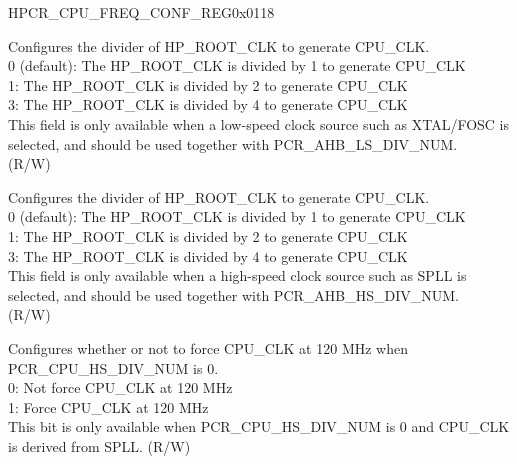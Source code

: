 \begin{register}{H}{PCR\_CPU\_FREQ\_CONF\_REG}{0x0118}\label{regdesc:PCRCPUFREQCONFREG}
%
%
%
%
\regnewline%
\begin{regdesc}\begin{reglist}
\label{fielddesc:PCRCPULSDIVNUM}\item [PCR\_CPU\_LS\_DIV\_NUM] Configures the divider of HP\_ROOT\_CLK to generate CPU\_CLK.\\
0 (default): The HP\_ROOT\_CLK is divided by 1 to generate CPU\_CLK\\
1: The HP\_ROOT\_CLK is divided by 2 to generate CPU\_CLK\\
3: The HP\_ROOT\_CLK is divided by 4 to generate CPU\_CLK\\
This field is only available when a low-speed clock source such as XTAL/FOSC is selected, and should be used together with PCR\_AHB\_LS\_DIV\_NUM.\\ (R/W)
\label{fielddesc:PCRCPUHSDIVNUM}\item [PCR\_CPU\_HS\_DIV\_NUM] Configures the divider of HP\_ROOT\_CLK to generate CPU\_CLK.\\
0 (default): The HP\_ROOT\_CLK is divided by 1 to generate CPU\_CLK\\
1: The HP\_ROOT\_CLK is divided by 2 to generate CPU\_CLK\\
3: The HP\_ROOT\_CLK is divided by 4 to generate CPU\_CLK\\
This field is only available when a high-speed clock source such as SPLL is selected, and should be used together with PCR\_AHB\_HS\_DIV\_NUM.\\ (R/W)
\label{fielddesc:PCRCPUHS120MFORCE}\item [PCR\_CPU\_HS\_120M\_FORCE] Configures whether or not to force CPU\_CLK at 120 MHz when PCR\_CPU\_HS\_DIV\_NUM is 0.\\
0: Not force CPU\_CLK at 120 MHz\\
1: Force CPU\_CLK at 120 MHz\\
This bit is only available when PCR\_CPU\_HS\_DIV\_NUM is 0 and CPU\_CLK is derived from SPLL. (R/W)

\end{reglist}\end{regdesc}
\end{register}


